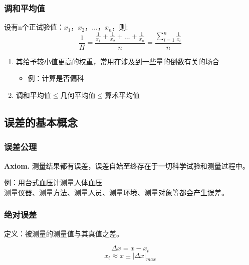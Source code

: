 \documentclass[UTF8]{ctexart}
\begin{document}
\subsubsection{调和平均值}
  \par 设有n个正试验值：$x_{1}，x_{2}，\ldots ，x_{n}$，则:
  \begin{equation}
  \frac{1}{H}=\frac{\frac{1}{x_1}+\frac{1}{x_2}+\ldots +\frac{1}{x_n}}{n}=\frac{\sum\limits_{i=1}^n\frac{1}{x_i}}{n}
  \end{equation}
  \begin{enumerate}[•]
    \item 其给予较小值更高的权重，常用在涉及到一些量的倒数有关的场合
     \begin{itemize}
      \item 例：计算是否偏科
    \end{itemize} 
    \item 调和平均值$\leqslant$几何平均值$\leqslant$算术平均值
  \end{enumerate}

\setcounter{equation}{0}
\subsection{误差的基本概念}
\subsubsection{误差公理}
\par \textbf{Axiom.} 测量结果都有误差，误差自始至终存在于一切科学试验和测量过程中。
\par  例：用台式血压计测量人体血压\\
 测量仪器、测量方法、测量人员、测量环境、测量对象等都会产生误差。

 
\subsubsection{绝对误差}
\par 定义：被测量的测量值与其真值之差。

\begin{equation}
  \Delta x=x-x_{t}
\end{equation}
\begin{equation}
    x_{t}\approx x\pm \left\lvert \Delta x\right\rvert _{max}
\end{equation}
\end{document}
